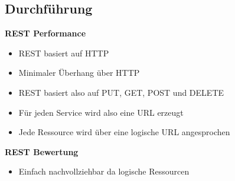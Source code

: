 \subsection{Durchführung}
\textbf{REST Performance}
\begin{itemize}
	\item REST basiert auf HTTP
	\item Minimaler Überhang über HTTP
	\item REST basiert also auf PUT, GET, POST und DELETE
	\item Für jeden Service wird also eine URL erzeugt
	\item Jede Ressource wird über eine logische URL angesprochen
\end{itemize}
\textbf{REST Bewertung}
\begin{itemize}
	\item Einfach nachvollziehbar da logische Ressourcen
\end{itemize}
